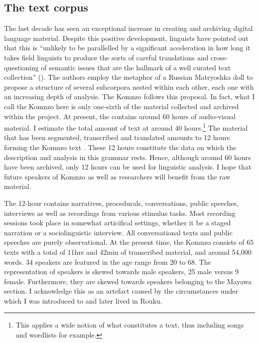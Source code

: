 \subsection{The text corpus}\label{thetextcorpus}

The last decade has seen an exceptional increase in creating and archiving digital language material. Despite this positive development, linguists have pointed out that this is ``unlikely to be parallelled by a significant acceleration in how long it takes field linguists to produce the sorts of careful translations and cross-questioning of semantic issues that are the hallmark of a well curated text collection'' (\citealt[25]{Evans:2006uu}). The authors employ the metaphor of a Russian Matryoshka doll to propose a structure of several subcorpora nested within each other, each one with an increasing depth of analysis. The Komnzo  follows this proposal. In fact, what I call the Komnzo  here is only one-sixth of the material collected and archived within the project. At present, the  contains around 60 hours of audio-visual material. I estimate the total amount of text at around 40 hours.\footnote{This applies a wide notion of what constitutes a text, thus including songs and wordlists for example.} The material that has been segmented, transcribed and translated amounts to 12 hours forming the Komnzo text . These 12 hours constitute the data on which the description and analysis in this grammar rests. Hence, although around 60 hours have been archived, only 12 hours can be used for linguistic analysis. I hope that future speakers of Komnzo as well as researchers will benefit from the raw material.

The 12-hour  contains narratives, procedurals, conversations, public speeches, interviews as well as recordings from various stimulus tasks. Most recording sessions took place in somewhat articifical settings, whether it be a staged narration or a sociolinguistic interview. All conversational texts and public speeches are purely observational. At the present time, the Komnzo  consists of 65 texts with a total of 11hrs and 42min of transcribed material, and around 54,000 words. 34 speakers are featured in the age range from 20 to 68. The representation of speakers is skewed towards male speakers, 25 male versus 9 female. Furthermore, they are skewed towards speakers belonging to the Mayawa section. I acknowledge this as an artefact caused by the circumstances under which I was introduced to and later lived in Rouku.

